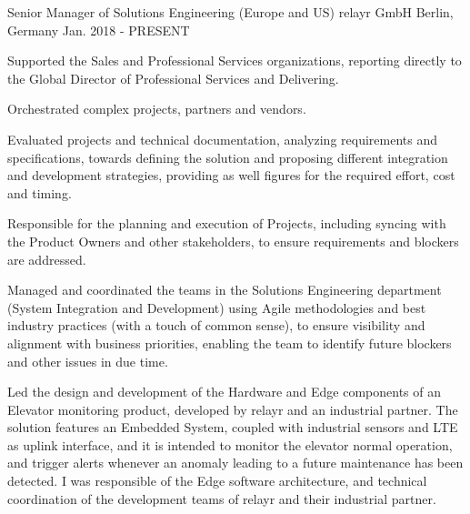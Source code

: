 

\begin{cventries}

  \cventry
    {Senior Manager of Solutions Engineering (Europe and US)} %
    {relayr GmbH} %
    {Berlin, Germany} %
    {Jan. 2018 - PRESENT} %
    {
      \begin{cvitems} %
        \item {Supported the Sales and Professional Services organizations, reporting directly to the Global Director of Professional Services and Delivering.}
        \item {Orchestrated complex projects, partners and vendors.}
        \item {Evaluated projects and technical documentation, analyzing requirements and specifications, towards defining the solution and proposing different integration and development strategies, providing as well figures for the required effort, cost and timing.}
        \item {Responsible for the planning and execution of Projects, including syncing with the Product Owners and other stakeholders, to ensure requirements and blockers are addressed.}
        \item {Managed and coordinated the teams in the Solutions Engineering department (System Integration and Development) using Agile methodologies and best industry practices (with a touch of common sense), to ensure visibility and alignment with business priorities, enabling the team to identify future blockers and other issues in due time.}
        \item {Led the design and development of the Hardware and Edge components of an Elevator monitoring product, developed by relayr and an industrial partner.  The solution features an Embedded System, coupled with industrial sensors and LTE as uplink interface, and it is intended to monitor the elevator normal operation, and trigger alerts whenever an anomaly leading to a future maintenance has been detected.  I was responsible of the Edge software architecture, and technical coordination of the development teams of relayr and their industrial partner.}

\end{cvitems}}
\end{cventries}
